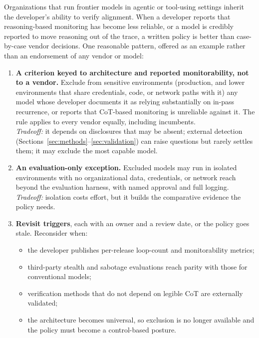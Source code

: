 \documentclass[11pt,letterpaper]{article}
\begin{document}
Organizations that run frontier models in agentic or tool-using settings inherit the developer's ability to verify alignment. When a developer reports that reasoning-based monitoring has become less reliable, or a model is credibly reported to move reasoning out of the trace, a written policy is better than case-by-case vendor decisions. One reasonable pattern, offered as an example rather than an endorsement of any vendor or model:

\begin{enumerate}
  \item \textbf{A criterion keyed to architecture and reported monitorability, not to a vendor.} Exclude from sensitive environments (production, and lower environments that share credentials, code, or network paths with it) any model whose developer documents it as relying substantially on in-pass recurrence, or reports that CoT-based monitoring is unreliable against it. The rule applies to every vendor equally, including incumbents.\\
  \emph{Tradeoff:} it depends on disclosures that may be absent; external detection (Sections~\ref{sec:methods}--\ref{sec:validation}) can raise questions but rarely settles them; it may exclude the most capable model.
  \item \textbf{An evaluation-only exception.} Excluded models may run in isolated environments with no organizational data, credentials, or network reach beyond the evaluation harness, with named approval and full logging.\\
  \emph{Tradeoff:} isolation costs effort, but it builds the comparative evidence the policy needs.
  \item \textbf{Revisit triggers}, each with an owner and a review date, or the policy goes stale. Reconsider when:
  \begin{itemize}
    \item the developer publishes per-release loop-count and monitorability metrics;
    \item third-party stealth and sabotage evaluations reach parity with those for conventional models;
    \item verification methods that do not depend on legible CoT are externally validated;
    \item the architecture becomes universal, so exclusion is no longer available and the policy must become a control-based posture.
  \end{itemize}
\end{enumerate}
\end{document}
